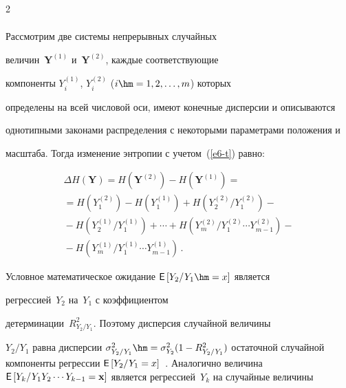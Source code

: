 \begin{multicols}{2}
\begin{multline}
  \end{multline}

  

  Рассмотрим две системы непрерывных случайных 

величин~$\mathbf{Y}^{(1)}$ и~$\mathbf{Y}^{(2)}$, каждые соответствующие 

компоненты $Y_i^{(1)}$, $Y_i^{(2)}$ ($i\hm=1, 2,\ldots , m$) которых 

определены на всей числовой оси, имеют конечные дисперсии и описываются 

однотипными законами распределения с некоторыми параметрами положения и 

масштаба. Тогда изменение энтропии с учетом~(\ref{e6-t}) равно:

  \begin{multline*}

  \Delta H(\mathbf{Y}) =H\left(\mathbf{Y}^{(2)}\right) -H\left(\mathbf{Y}^{(1)}\right) 

={}\\

{}=

H\left(Y_1^{(2)}\right) -H\left(Y_1^{(1)}\right) +H\left(Y_2^{(2)}/Y_1^{(2)}\right)-{}\\

  {}- H\left( Y_2^{(1)}/Y_1^{(1)}\right) +\cdots + 

H\left(Y_m^{(2)}/Y_1^{(2)}\cdots Y_{m-1}^{(2)}\right) -{}\\

{}- H\left( Y_m^{(1)}/Y_1^{(1)}\cdots Y_{m-

1}^{(1)}\right)\,.

  \end{multline*}

  

  Условное математическое ожидание ${\sf E}\left[ Y_2/Y_1\hm=x\right]$ является 

регрессией~$Y_2$ на~$Y_1$ с коэффициентом 

детерминации~$R^2_{Y_2/Y_1}$. Поэтому дисперсия случайной величины 

$Y_2/Y_1$ равна дисперсии $\sigma^2_{Y_2/Y_1} \hm= \sigma^2_{Y_2}

  (1-R^2_{Y_2/Y_1})$ остаточной случайной компоненты регрессии ${\sf E}\left[ 

Y_2/Y_1=x\right]$~\cite{12-t}. Аналогично величина ${\sf E}\left[ Y_k/Y_1Y_2\cdots 

Y_{k-1}=\mathbf{x}\right]$ является регрессией~$Y_k$ на случайные величины 


\end{multicols}
